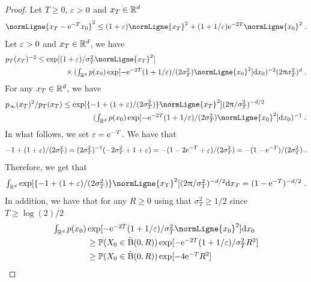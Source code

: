 \begin{proof}
  Let $T \geq 0$, $\varepsilon >0$ and $x_T \in \mathbb{R}^d$
  \begin{equation}
    \normLigne{x_T - \rme^{-T} x_0}^2 \leq (1 + \vareps) \normLigne{x_T}^2 + (1+1/\vareps) \rme^{-2T} \normLigne{x_0}^2 \eqsp . 
  \end{equation}
  Let $\varepsilon >0$ and $x_T \in \mathbb{R}^d$, we have
  \begin{align}
    &\textstyle{
      p_T(x_T)^{-2} \leq \exp[(1+\vareps)/\sigma_T^2\normLigne{x_T}^2 ] }\\
    & \qquad \qquad \qquad \qquad \times \textstyle{(\int_{\rset^d} p(x_0) \exp[-\rme^{-2T}(1+1/\vareps)/(2\sigma_T^2)\normLigne{x_0}^2]\rmd x_0)^{-2} (2\uppi\sigma_T^2)^d  \eqsp .
      }
  \end{align}
  For any $x_T \in \mathbb{R}^d$, we have
  \begin{align}
    p_\infty(x_T)^2/p_T(x_T) &\leq \exp[\{-1+(1+\vareps)/(2\sigma_T^2)\}\normLigne{x_T}^2 ](2\uppi/\sigma_T^2)^{-d/2} \\ & \qquad \qquad \textstyle{ (\int_{\rset^d} p(x_0) \exp[-\rme^{-2T}(1+1/\vareps)/(2\sigma_T^2)\normLigne{x_0}^2] \rmd x_0)^{-1}  \eqsp . }
  \end{align}
  In what follows, we set $\varepsilon = \mathrm{e}^{-T}$. We have that
  \begin{equation}
    -1 + (1+\varepsilon)/(2\sigma_T^2) = (2\sigma_T^2)^{-1}(-2\sigma_T^2 + 1 + \varepsilon) = -(1 - 2\mathrm{e}^{-T} + \varepsilon)/(2\sigma_T^2) = -(1 - \mathrm{e}^{-T})/(2\sigma_T^2) \; . 
  \end{equation}
  Therefore, we get that
  \begin{equation}
    \label{eq:UNO_de}
    \textstyle{
      \int_{\rset^d} \exp[\{-1+(1+\vareps)/(2\sigma_T^2)\}\normLigne{x_T}^2 ](2\uppi/\sigma_T^2)^{-d/2} \rmd x_T = (1 - \rme^{-T})^{-d/2} \eqsp .
      }
    \end{equation}
    In addition, we have that for any $R \geq 0$ using that $\sigma_T^2 \geq 1/2$ since $T \geq \log(2)/2$
    \begin{align}
      &\textstyle{
        \int_{\rset^d} p(x_0) \exp[-\rme^{-2T}(1+1/\vareps)/\sigma_T^2\normLigne{x_0}^2] \rmd x_0 } \\
      & \qquad \qquad  \geq \textstyle{\probaLigne{X_0 \in \cball{0}{R}} \exp[-\rme^{-2T}(1+1/\vareps)/\sigma_T^2R^2]} \\ 
        & \qquad \qquad  \geq \textstyle{\probaLigne{X_0 \in \cball{0}{R}} \exp[-4\rme^{-T}R^2]
        } \label{eq:inter_DUO}
    \end{align}

\end{proof}
